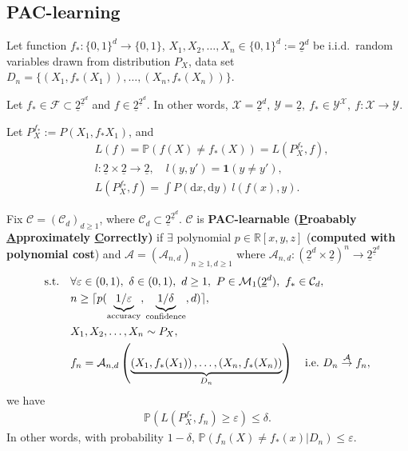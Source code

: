 \documentclass[twoside]{article}
\begin{document}
\subsection{PAC-learning}

Let function  $f_*: \{0,1\}^d \rightarrow \{0,1\}$, $ X_1, X_2, \ldots, X_n \in \{0,1\}^d := \underline{2}^d$ be i.i.d.\ random variables drawn from distribution $P_X$, data set $D_n=\{ \left( X_1, f_*(X_1)\right), \ldots, \left( X_n, f_*(X_n)\right) \}$.

Let $f_* \in \mathcal{F} \subset \underline{2}^{ \underline{2}^d } $ and $f \in \underline{2}^{ \underline{2}^d } $. In other words, $\mathcal{X}= \underline{2}^d,\ \mathcal{Y}=\underline{2},\ f_* \in \mathcal{Y}^{\mathcal{X}},\ f: \mathcal{X}\rightarrow \mathcal{Y}$.

Let $P_X^{f_*}:= P(X_1, f_*{X_1})$, and 
\begin{align*}
    & L(f) = \mathbb{P} \left( f(X) \ne f_*(X) \right) = L( P_X^{f_*} ,f ),\\
    & l: \underline{2} \times \underline{2} \rightarrow \underline{2}, \quad l(y,y') = \mathbf{1}(y\ne y'),\\
    & L( P_X^{f_*},f  ) = \int P(\mathrm{d}x, \mathrm{d}y) \ l( f(x),y ).
\end{align*}

\begin{definition}
    Fix $\mathcal{C} = (\mathcal{C}_d)_{d\ge 1}$, where $\mathcal{C}_d \subset \underline{2}^{\underline{2}^d }$. $\mathcal{C}$ is \textbf{PAC-learnable (\underline{P}roabably \underline{A}pproximately \underline{C}orrectly)} if $\exists$ polynomial $p\in \mathbb{R}[x,y,z]$ (\textbf{computed with polynomial cost})  and $\mathcal{A}= (\mathcal{A}_{n,d})_{n\ge 1, d\ge 1}$ where $\mathcal{A}_{n,d}:\left( \underline{2}^d\times \underline{2} \right)^n \rightarrow  \underline{2}^{ \underline{2}^d }$
    \begin{align*}
        \text{s.t.\quad }
        & \forall  \varepsilon \in (0,1), \ \delta \in(0,1), \ d\ge 1, \ P \in \mathcal{M}_1(\underline{2}^d),\  f_* \in \mathcal{C}_d,\\
        & n\ge \lceil p( \underbrace{1/\varepsilon}_{\text{accuracy}}, \underbrace{1/\delta}_{\text{confidence}}, d )\rceil,\\
        & X_1,X_2,\ldots,X_n\sim P_X,\\
        & f_n = \mathcal{A}_{n,d} \left( \underbrace{\left( X_1, f_*(X_1)\right), \ldots, \left( X_n, f_*(X_n)\right)}_{D_n} \right)  \quad \text{i.e.\ $D_n \overset{\mathcal{A}}{\rightarrow} f_n$},
    \end{align*}
    we have
    \begin{align*}
        \mathbb{P}\left( L\left( P_X^{f_*},f_n \right) \ge \varepsilon  \right) \le \delta.
    \end{align*}
    In other words, with probability $1-\delta$, $\mathbb{P} \left( f_n(X) \ne f_*(x) | D_n \right) \le \varepsilon$.
\end{definition} 
\end{document}
